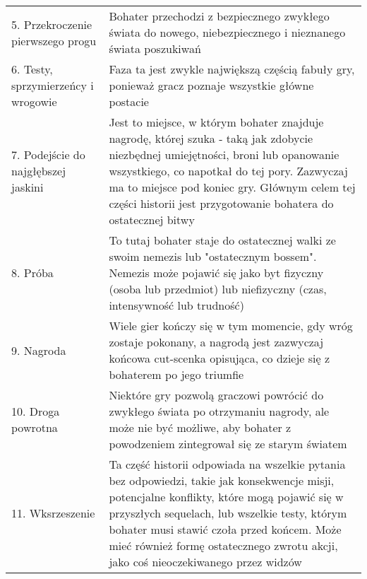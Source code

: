 \begin{table}[h!]
\begin{center}
\begin{tabular}{p{1.5in} p{4in}}
			5. Przekroczenie pierwszego progu   & Bohater przechodzi z bezpiecznego zwykłego świata do nowego, niebezpiecznego i nieznanego świata poszukiwań                                                                                                                                                                                                                     \\
			6. Testy, sprzymierzeńcy i wrogowie & Faza ta jest zwykle największą częścią fabuły gry, ponieważ gracz poznaje wszystkie główne postacie                                                                                                                                                                                                                             \\
			7. Podejście do najgłębszej jaskini & Jest to miejsce, w którym bohater znajduje nagrodę, której szuka - taką jak zdobycie niezbędnej umiejętności, broni lub opanowanie wszystkiego, co napotkał do tej pory. Zazwyczaj ma to miejsce pod koniec gry. Głównym celem tej części historii jest przygotowanie bohatera do ostatecznej bitwy                             \\
			8. Próba                            & To tutaj bohater staje do ostatecznej walki ze swoim nemezis lub "ostatecznym bossem". Nemezis może pojawić się jako byt fizyczny (osoba lub przedmiot) lub niefizyczny (czas, intensywność lub trudność)                                                                                                                       \\
			9. Nagroda                          & Wiele gier kończy się w tym momencie, gdy wróg zostaje pokonany, a nagrodą jest zazwyczaj końcowa cut-scenka opisująca, co dzieje się z bohaterem po jego triumfie                                                                                                                                                              \\
			10. Droga powrotna                  & Niektóre gry pozwolą graczowi powrócić do zwykłego świata po otrzymaniu nagrody, ale może nie być możliwe, aby bohater z powodzeniem zintegrował się ze starym światem                                                                                                                                                          \\
			11. Wksrzeszenie                    & Ta część historii odpowiada na wszelkie pytania bez odpowiedzi, takie jak konsekwencje misji, potencjalne konflikty, które mogą pojawić się w przyszłych sequelach, lub wszelkie testy, którym bohater musi stawić czoła przed końcem. Może mieć również formę ostatecznego zwrotu akcji, jako coś nieoczekiwanego przez widzów \\

\end{tabular}
\end{center}
\end{table}
